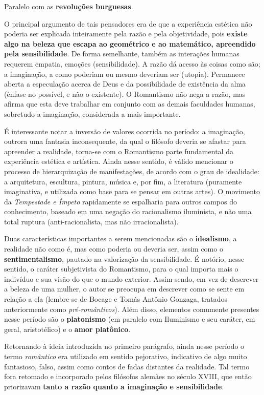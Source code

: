 Paralelo com as \textbf{revoluções burguesas}.

O principal argumento de tais pensadores era de que a experiência estética não poderia ser explicada inteiramente pela razão e pela objetividade, pois \textbf{existe algo na beleza que escapa ao geométrico e ao matemático, apreendido pela sensibilidade}. De forma semelhante, também as interações humanas requerem empatia, emoções (sensibilidade). A razão dá acesso às coisas como são; a imaginação, a como poderiam ou mesmo deveriam ser (utopia). Permanece aberta a especulação acerca de Deus e da possibilidade de existência da alma (ênfase no possível, e não o existente). O Romantismo não nega a razão, mas afirma que esta deve trabalhar em conjunto com as demais faculdades humanas, sobretudo a imaginação, considerada a mais importante.

É interessante notar a inversão de valores ocorrida no período: a imaginação, outrora uma fantasia inconsequente, da qual o filósofo deveria se afastar para apreender a realidade, torna-se com o Romantismo parte fundamental da experiência estética e artística. Ainda nesse sentido, é válido mencionar o processo de hierarquização de manifestações, de acordo com o grau de idealidade: a arquitetura, escultura, pintura, música e, por fim, a literatura (puramente imaginativa, e utilizada como base para se pensar em outras artes). O movimento da \textit{Tempestade e Ímpeto} rapidamente se espalharia para outros campos do conhecimento, baseado em uma negação do racionalismo iluminista, e não uma total ruptura (anti-racionalista, mas não irracionalista).

Duas características importantes a serem mencionadas são o \textbf{idealismo}, a realidade não como é, mas como poderia ou deveria ser, assim como o \textbf{sentimentalismo}, pautado na valorização da sensibilidade. É notório, nesse sentido, o caráter subjetivista do Romantismo, para o qual importa mais o indivíduo e sua visão do que o mundo exterior. Assim sendo, em vez de descrever a beleza de uma mulher, o autor se preocupa em descrever como se sente em relação a ela (lembre-se de Bocage e Tomás Antônio Gonzaga, tratados anteriormente como \textit{pré-românticos}). Além disso, elementos comumente presentes nesse período são o \textbf{platonismo} (em paralelo com Iluminismo e seu caráter, em geral, aristotélico) e o \textbf{amor platônico}.

Retornando à ideia introduzida no primeiro parágrafo, ainda nesse período o termo \textit{romântico} era utilizado em sentido pejorativo, indicativo de algo muito fantasioso, falso, assim como contos de fadas distantes da realidade. Tal termo fora retomado e incorporado pelos filósofos alemães no século XVIII, que então priorizavam \textbf{tanto a razão quanto a imaginação e sensibilidade}.

